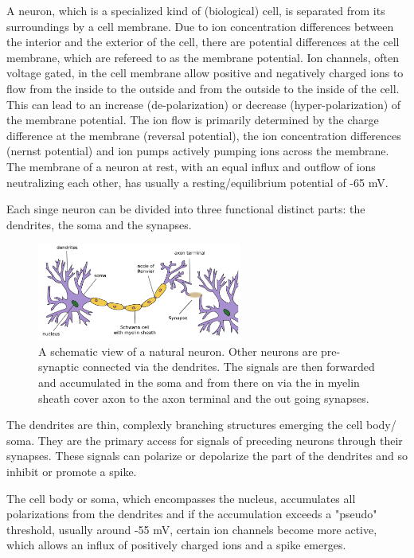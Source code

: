 A neuron, which is a specialized kind of (biological) cell, is separated from its surroundings by a cell membrane.   
Due to ion concentration differences between the interior and the exterior of the cell, there are potential differences at the cell membrane, which are refereed to as the membrane potential. 
Ion channels, often voltage gated, in the cell membrane allow positive and negatively charged ions to flow from the inside to the outside and from the outside to the inside of the cell.
This can lead to an increase (de-polarization) or decrease (hyper-polarization) of the membrane potential.
The ion flow is primarily determined by the charge difference at the membrane (reversal potential), the ion concentration differences (nernst potential) and ion pumps actively pumping ions across the membrane.
The membrane of a neuron at rest, with an equal influx and outflow of ions neutralizing each other, has usually a resting/equilibrium potential of -65 mV. 

Each singe neuron can be divided into three functional distinct parts: the dendrites, the soma and the synapses.

\begin{figure}[h]
	\centering
    	\includegraphics[width=0.6\textwidth]{imgs/neuron.png} 
    \caption{A schematic view of a natural neuron. Other neurons are pre-synaptic connected via the dendrites. The signals are then forwarded and accumulated in the soma and from there on via the in myelin sheath cover axon to the axon terminal and the out going synapses.}
	\label{fig:neurpn}
\end{figure}

The dendrites are thin, complexly branching structures emerging the cell body/ soma.
They are the primary access for signals of preceding neurons through their synapses. 
These signals can polarize or depolarize the part of the dendrites and so inhibit or promote a spike. 

The cell body or soma, which encompasses the nucleus, accumulates all polarizations from the dendrites and if the accumulation exceeds a "pseudo" threshold, usually around -55 mV, certain ion channels become more active, which allows an influx of positively charged ions and a spike emerges.

